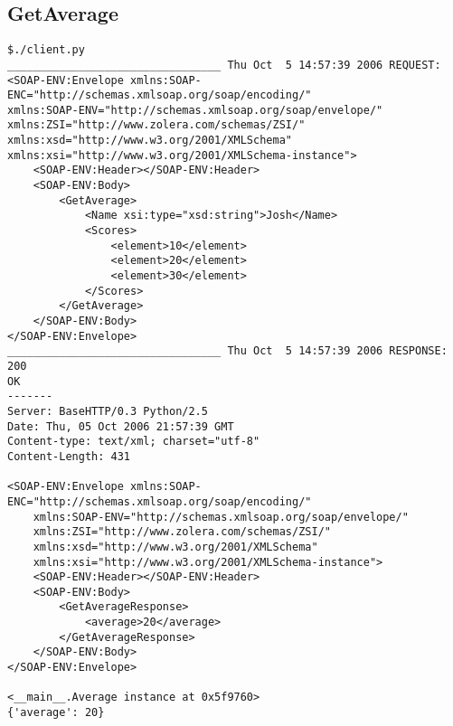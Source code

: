 \subsection{GetAverage}
\begin{verbatim}
$./client.py
_________________________________ Thu Oct  5 14:57:39 2006 REQUEST:
<SOAP-ENV:Envelope xmlns:SOAP-ENC="http://schemas.xmlsoap.org/soap/encoding/"
xmlns:SOAP-ENV="http://schemas.xmlsoap.org/soap/envelope/"
xmlns:ZSI="http://www.zolera.com/schemas/ZSI/"
xmlns:xsd="http://www.w3.org/2001/XMLSchema"
xmlns:xsi="http://www.w3.org/2001/XMLSchema-instance">
	<SOAP-ENV:Header></SOAP-ENV:Header>
	<SOAP-ENV:Body>
		<GetAverage>
			<Name xsi:type="xsd:string">Josh</Name>
			<Scores>
				<element>10</element>
				<element>20</element>
				<element>30</element>
			</Scores>
		</GetAverage>
	</SOAP-ENV:Body>
</SOAP-ENV:Envelope>
_________________________________ Thu Oct  5 14:57:39 2006 RESPONSE:
200
OK
-------
Server: BaseHTTP/0.3 Python/2.5
Date: Thu, 05 Oct 2006 21:57:39 GMT
Content-type: text/xml; charset="utf-8"
Content-Length: 431

<SOAP-ENV:Envelope xmlns:SOAP-ENC="http://schemas.xmlsoap.org/soap/encoding/"
	xmlns:SOAP-ENV="http://schemas.xmlsoap.org/soap/envelope/"
	xmlns:ZSI="http://www.zolera.com/schemas/ZSI/"
	xmlns:xsd="http://www.w3.org/2001/XMLSchema"
	xmlns:xsi="http://www.w3.org/2001/XMLSchema-instance">
	<SOAP-ENV:Header></SOAP-ENV:Header>
	<SOAP-ENV:Body>
		<GetAverageResponse>
			<average>20</average>
		</GetAverageResponse>
	</SOAP-ENV:Body>
</SOAP-ENV:Envelope>

<__main__.Average instance at 0x5f9760>
{'average': 20}
\end{verbatim}

